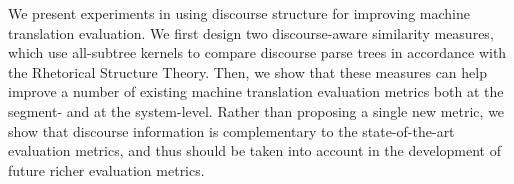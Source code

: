 We present experiments in using discourse structure for improving machine translation evaluation. We first design two discourse-aware similarity measures, which use all-subtree kernels to compare discourse parse trees in accordance with the Rhetorical Structure Theory. Then, we show that these measures can help improve a number of existing machine translation evaluation metrics both at the segment- and at the system-level. Rather than proposing a single new metric, we show that discourse information is complementary to the state-of-the-art evaluation metrics, and thus should be taken into account in the development of future richer evaluation metrics.
